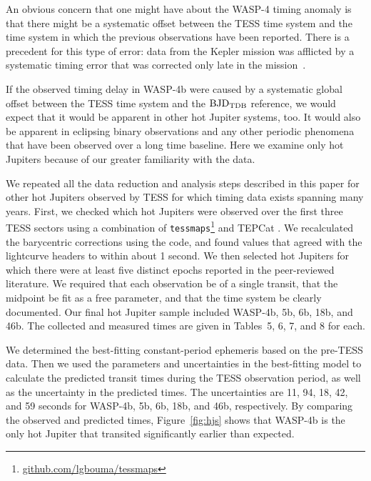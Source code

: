 \documentclass[12pt,twocolumn,tighten]{aastex62}
\begin{document}
An obvious concern that one might have about the WASP-4 timing anomaly
is that there might be a systematic offset between the TESS time
system and the time system in which the previous observations have
been reported.  There is a precedent for this type of error: data from
the Kepler mission was afflicted by a systematic timing error that was
corrected only late in the mission~\citep[][Section
  3.4]{kepler_DR19_2013}.

If the observed timing delay in WASP-4b were caused by a systematic
global offset between the TESS time system and the ${\rm BJD}_{\rm
TDB}$ reference, we would expect that it would be apparent in other
hot Jupiter systems, too. It would also be apparent in eclipsing
binary observations and any other periodic phenomena that have been
observed over a long time baseline. Here we examine only hot Jupiters
because of our greater familiarity with the data.

We repeated all the data reduction and analysis steps described in
this paper for other hot Jupiters observed by TESS for which timing
data exists spanning many years.  First, we checked which hot Jupiters
were observed over the first three TESS sectors using a combination of
\texttt{tessmaps}\footnote{\url{github.com/lgbouma/tessmaps}} and
TEPCat \citep{southworth_homogeneous_2011}.  We recalculated the
barycentric corrections using the \citet{eastman_achieving_2010} code,
and found values that agreed with the lightcurve headers to within
about 1 second.  We then selected hot Jupiters for which there were at
least five distinct epochs reported in the peer-reviewed literature.
We required that each observation be of a single transit, that the
midpoint be fit as a free parameter, and that the time system be
clearly documented.  Our final hot Jupiter sample included WASP-4b,
5b, 6b, 18b, and 46b.  The collected and measured times are given in
Tables~5, 6, 7, and 8 for each.

We determined the best-fitting constant-period ephemeris based on the
pre-TESS data. Then we used the parameters and uncertainties in the
best-fitting model to calculate the predicted transit times during
the TESS observation period, as well as the uncertainty in the
predicted times.  The uncertainties are 11, 94, 18, 42, and 59 seconds
for WASP-4b, 5b, 6b, 18b, and 46b, respectively.  By comparing the
observed and predicted times, Figure~\ref{fig:hjs} shows that WASP-4b
is the only hot Jupiter that transited significantly earlier than
expected.
\end{document}
